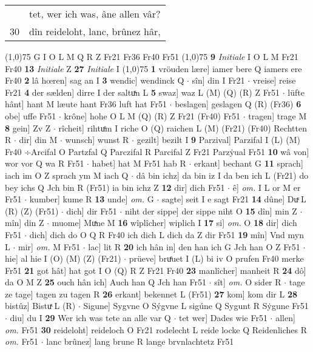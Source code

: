 \documentclass[8pt,a4paper,notitlepage]{article}
\begin{document}
\begin{table}[ht]
\begin{minipage}[t]{0.5\linewidth}
\begin{tabular}{rl}
 & tet, wer ich was, âne allen vâr?\\ 
30 & dîn reideloht, lanc, brûnez hâr,\\ 
\end{tabular}
\scriptsize
\line(1,0){75} \newline
G I O L M Q R Z Fr21 Fr36 Fr40 Fr51 \newline
\line(1,0){75} \newline
\textbf{9} \textit{Initiale} I O L M Fr21 Fr40  \textbf{13} \textit{Initiale} Z  \textbf{27} \textit{Initiale} I  \newline
\line(1,0){75} \newline
\textbf{1} vröuden lære] iamer bere Q iamers ere Fr40 \textbf{2} lâ hœren] sag an I \textbf{3} wendic] wendinck Q  $\cdot$ sîn] din I Fr21  $\cdot$ vreise] reise Fr21 \textbf{4} der sælden] dirre I der saltuͯn L \textbf{5} swaz] waz L (M) (Q) (R) Z Fr51  $\cdot$ lüfte hânt] hant M læute hant Fr36 luft hat Fr51  $\cdot$ beslagen] geslagen Q (R) (Fr36) \textbf{6} obe] uffe Fr51  $\cdot$ krône] hohe O L M (Q) (R) Z Fr21 (Fr40) Fr51  $\cdot$ tragen] trage M \textbf{8} gein] Zv Z  $\cdot$ rîcheit] rihtuͤm I riche O (Q) raichen L (M) (Fr21) (Fr40) Rechtten R  $\cdot$ dir] din M  $\cdot$ wunsch] wunst R  $\cdot$ gezilt] bezilt I \textbf{9} Parzival] Parzifal I (L) (M) Fr40 ÷Arcifal O Partzfal Q Parczifal R Parcifal Z Fr21 Parzẏual Fr51 \textbf{10} wâ von] wor vor Q wa R Fr51  $\cdot$ habet] hat M Fr51 hab R  $\cdot$ erkant] bechant G \textbf{11} sprach] iach im O Z sprach ym M iach Q  $\cdot$ dâ bin ichz] da bin iz I da ben ich L (Fr21) do bey ichs Q Jch bin R (Fr51) ia bin ichz Z \textbf{12} dir] dich Fr51  $\cdot$ ê] \textit{om.} I L or M er Fr51  $\cdot$ kumber] kume R \textbf{13} unde] \textit{om.} G  $\cdot$ sagte] seit I e sagt Fr21 \textbf{14} dûne] Duͯ L (R) (Z) (Fr51)  $\cdot$ dich] dir Fr51  $\cdot$ niht der sippe] der sippe niht O \textbf{15} dîn] min Z  $\cdot$ mîn] din Z  $\cdot$ muome] Muͯne M \textbf{16} wîplîcher] wiplich I \textbf{17} si] \textit{om.} O \textbf{18} dir] dich Fr51  $\cdot$ dich] dich do O Q R Fr40 ich dich L dich da Z dir Fr51 \textbf{19} mîn] Vnd myn L  $\cdot$ mir] \textit{om.} M Fr51  $\cdot$ lac] lit R \textbf{20} ich hân in] den han ich G Jch han O Z Fr51  $\cdot$ hie] al hie I (O) (M) (Z) (Fr21)  $\cdot$ prüeve] bruͤuet I (L) bi iv O prufen Fr40 merke Fr51 \textbf{21} got hât] hat got I O (Q) R Z Fr21 Fr40 \textbf{23} manlîcher] manheit R \textbf{24} dô] da O M Z \textbf{25} ouch hân ich] Auch han Q Jch han Fr51  $\cdot$ sît] \textit{om.} O sider R  $\cdot$ tage ze tage] tagen zu tagen R \textbf{26} erkant] bekennet L (Fr51) \textbf{27} kom] kom dir L \textbf{28} bistûz] Bistuͯ L (R)  $\cdot$ Sigune] Sygvne O Sýgvne L sigúne Q Sygunt R Sẏgune Fr51  $\cdot$ diu] du I \textbf{29} Wer ich was tete an alle var Q  $\cdot$ tet wer] Dades wie Fr51  $\cdot$ allen] \textit{om.} Fr51 \textbf{30} reideloht] reideloch O Fr21 rodelecht L reide locke Q Reidenliches R \textit{om.} Fr51  $\cdot$ lanc brûnez] lang brune R lange brvnlachtetz Fr51 \newline

\end{minipage}
\end{table}
\end{document}
